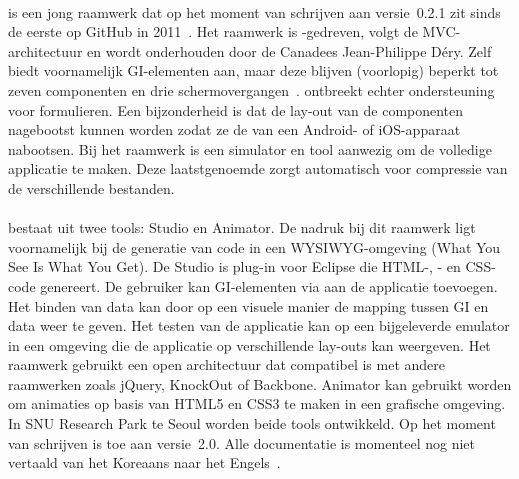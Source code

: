 \paragraph{\moobile} %
\moobile{} is een jong raamwerk dat op het moment van schrijven aan versie~0.2.1 zit sinds de eerste  op GitHub in 2011~\cite{Dery2013}.
Het raamwerk is \js{}-gedreven, volgt de MVC-architectuur en wordt onderhouden door de Canadees Jean-Philippe Déry.
Zelf biedt \moobile{} voornamelijk GI-elementen aan, maar deze blijven (voorlopig) beperkt tot zeven componenten en drie schermovergangen~\cite{Dery2013}.
\moobile{} ontbreekt echter ondersteuning voor formulieren.
Een bijzonderheid is dat de lay-out van de componenten nagebootst kunnen worden zodat ze de  van een Android- of iOS-apparaat nabootsen.
Bij het raamwerk is een simulator en tool aanwezig om de volledige applicatie te maken.
Deze laatstgenoemde zorgt automatisch voor compressie van de verschillende bestanden.

\paragraph{\davinci}%
\davinci{} bestaat uit twee tools:  \davinci{} Studio en \davinci{} Animator.
De nadruk bij dit raamwerk ligt voornamelijk bij de generatie van code in een WYSIWYG-omgeving (What You See Is What You Get).
De \davinci{} Studio is plug-in voor Eclipse die HTML-,  \js{}- en CSS-code genereert.
De gebruiker kan GI-elementen via  aan de applicatie toevoegen.
Het binden van data kan door op een visuele manier de mapping tussen GI en data weer te geven.
Het testen van de applicatie kan op een bijgeleverde emulator in een  omgeving die de applicatie op verschillende lay-outs kan weergeven.
Het raamwerk gebruikt een open architectuur dat compatibel is met andere  raamwerken zoals jQuery, KnockOut of Backbone.
\davinci{} Animator kan gebruikt worden om animaties op basis van HTML5 en CSS3 te maken in een grafische omgeving.
In SNU Research Park te Seoul worden beide tools ontwikkeld.
Op het moment van schrijven is \davinci{} toe aan versie~2.0.  
Alle documentatie is momenteel nog niet vertaald van het Koreaans naar het Engels~\cite{Incross}.

